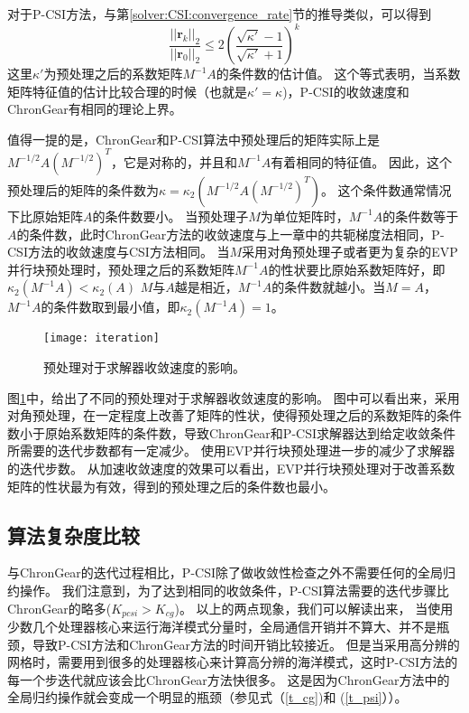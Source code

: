 对于P-CSI方法，与第\ref{solver:CSI:convergence_rate}节的推导类似，可以得到
\begin{equation}
\label{pcsi_convergence}
\frac{||\textbf{r}_k||_2}{||\textbf{r}_0||_2}  \le 2(\frac{\sqrt{\kappa'}-1}{\sqrt{\kappa'}+1})^k
\end{equation}
这里$\kappa'$为预处理之后的系数矩阵${M^{-1}A}$的条件数的估计值。
这个等式表明，当系数矩阵特征值的估计比较合理的时候（也就是$\kappa' =\kappa$)，P-CSI的收敛速度和ChronGear有相同的理论上界。

值得一提的是，ChronGear和P-CSI算法中预处理后的矩阵实际上是$M^{-1/2}A(M^{-1/2})^T$，它是对称的，并且和$M^{-1}A$有着相同的特征值\cite{Shewchuk1994}。
因此，这个预处理后的矩阵的条件数为$\kappa =  \kappa_2(M^{-1/2}A(M^{-1/2})^T)$。
这个条件数通常情况下比原始矩阵$A$的条件数要小。 
当预处理子$M$为单位矩阵时，${M^{-1}A}$的条件数等于$A$的条件数，此时ChronGear方法的收敛速度与上一章中的共轭梯度法相同，P-CSI方法的收敛速度与CSI方法相同。
当$M$采用对角预处理子或者更为复杂的EVP并行块预处理时，预处理之后的系数矩阵${M^{-1}A}$的性状要比原始系数矩阵好，即
$\kappa_2({M^{-1}A}) < \kappa_2(A)$
$M$与$A$越是相近，$M^{-1}A$的条件数就越小。当$M = A$，$M^{-1}A$的条件数取到最小值，即$\kappa_2(M^{-1 }A ) = 1$。 

\begin {figure}[!t]
\begin{center}
\texttt{[image: iteration]}
\caption []{预处理对于求解器收敛速度的影响。\label{fig:iteration}}
\end{center}
\end {figure}
图\ref{fig:iteration}中，给出了不同的预处理对于求解器收敛速度的影响。 
图中可以看出来，采用对角预处理，在一定程度上改善了矩阵的性状，使得预处理之后的系数矩阵的条件数小于原始系数矩阵的条件数，导致ChronGear和P-CSI求解器达到给定收敛条件所需要的迭代步数都有一定减少。
使用EVP并行块预处理进一步的减少了求解器的迭代步数。
从加速收敛速度的效果可以看出，EVP并行块预处理对于改善系数矩阵的性状最为有效，得到的预处理之后的条件数也最小。

\subsection{算法复杂度比较}
\label{precond:ChronGear:comm}


与ChronGear的迭代过程相比，P-CSI除了做收敛性检查之外不需要任何的全局归约操作。 
我们注意到，为了达到相同的收敛条件，P-CSI算法需要的迭代步骤比ChronGear的略多($K_{pcsi} > K_{cg}$)。 
以上的两点现象，我们可以解读出来，
当使用少数几个处理器核心来运行海洋模式分量时，全局通信开销并不算大、并不是瓶颈，导致P-CSI方法和ChronGear方法的时间开销比较接近。
但是当采用高分辨的网格时，需要用到很多的处理器核心来计算高分辨的海洋模式，这时P-CSI方法的每一个步迭代就应该会比ChronGear方法快很多。
这是因为ChronGear方法中的全局归约操作就会变成一个明显的瓶颈（参见式（\ref{t_cg})和
(\ref{t_psi}））。

